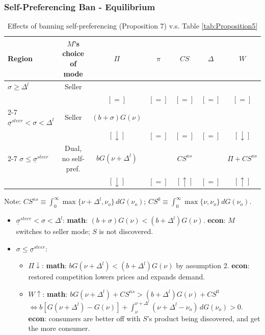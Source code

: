 \begin{frame}
  \frametitle{Self-Preferencing Ban - Equilibrium}
  \scriptsize
  \vspace{-0.35cm}
  \begin{table}
  \centering
  \caption{Effects of banning self-preferencing (Proposition 7) v.s. Table \ref{tab:Proposition5}}
  \label{tab:self-preferencing-ban-effects}
  \scriptsize
  \begin{threeparttable}
  \begin{tabular}{@{}lcccccc@{}}
    \toprule
    Region & $M$'s choice of mode & $\Pi$ & $\pi$ & $CS$  & $\Delta$ & $W$ \\ 
    \midrule
    $\sigma\geq\Delta^l$
      & Seller
      & &  &  &  &  \\
      & & $[=]$ & $[=]$ & $[=]$ & $[=]$ & $[=]$ \\
      \cmidrule(lr){2-7}
    $\underline{\sigma}^{steer}<\sigma<\Delta^l$
      & Seller
      & $(b+\sigma)G(\nu)$  &  & &  &  \\
      & & $[\downarrow]$ & $[=]$ & $[=]$ & $[=]$ & $[\downarrow]$ \\
      \cmidrule(lr){2-7}
    $\sigma\leq\underline{\sigma}^{steer}$
      & Dual, no self-pref.
      & $bG(\nu+\Delta^l)$ & & $CS^{ns}$ &  & $\Pi+CS^{ns}$ \\
      & & $[\downarrow]$ & $[=]$ & $[\uparrow]$ & $[=]$ & $[\uparrow]$ \\
    \bottomrule
  \end{tabular}

  \begin{tablenotes}
    \scriptsize
    \item Note: 
    $CS^{ns}\equiv\int_0^\infty\max\{\nu+\Delta^l,\nu_o\}\,dG(\nu_o)$; 
    $CS^{0}\equiv\int_0^\infty\max\{\nu,\nu_o\}\,dG(\nu_o)$.
  \end{tablenotes}
  \end{threeparttable}
\end{table}
  \vspace{-0.15cm}
  \begin{itemize}
    \item $\underline{\sigma}^{steer}<\sigma<\Delta^l$: \textbf{math}: $(b+\sigma)G(\nu)<(b+\Delta^l)G(\nu)$. \textbf{econ}: $M$ switches to seller mode; $S$ is not discovered.
    \item $\sigma\leq\underline{\sigma}^{steer}$: 
    \begin{itemize} \scriptsize
      \item $\Pi \downarrow$: \textbf{math}: $b G(\nu + \Delta^l) < (b + \Delta^l) G(\nu)$  by assumption 2. \textbf{econ}: restored competition lowers prices and expands demand.
      \item $W \uparrow$: \textbf{math}: $bG(\nu+\Delta^l) + CS^{ns} > (b+\Delta^l)G(\nu) + CS^0$ $ \Leftrightarrow b \left[ G(\nu+\Delta^l)-G(\nu) \right] + \int_{\nu}^{\nu+\Delta^l} (\nu+\Delta^l-\nu_o)\,dG(\nu_o) >0$. \textbf{econ}: consumers are better off with $S$'s product being discovered, and get the more consumer.
    \end{itemize}
  \end{itemize}

\end{frame}

